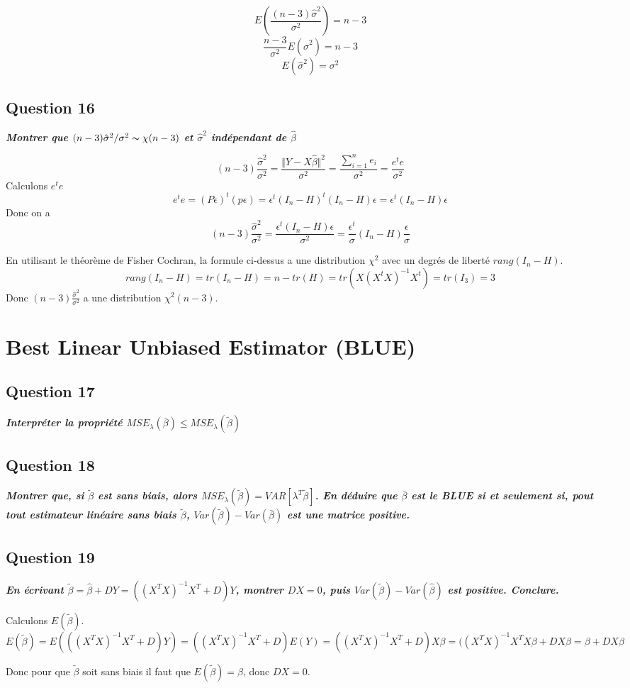 \documentclass[pdflatex]{article}
\theoremstyle{definition}
\newcommand{\quest}[1]{\textbf{\textit{#1}} \vspace{3mm}}
\begin{document}
$$
E\left(\frac{(n-3)\hat{\sigma}^2}{\sigma^2}\right) = n-3
$$
$$
\frac{n-3}{\sigma^2}E(\hat{\sigma}^2) = n-3
$$
$$
E(\hat{\sigma}^2) = \sigma^2
$$




\subsection*{Question 16}
\quest{Montrer que $(n-3)\hat{\sigma}^2/\sigma^2 \thicksim \chi (n-3)$ et $\hat{\sigma}^2$ ind\'ependant de $\hat{\beta}$}

$$
(n-3)\frac{\hat{\sigma}^2}{\sigma^2} = \frac{\Vert Y - X\hat{\beta}\Vert^2}{\sigma^2} = \frac{\sum_{i=1}^{n}e_i}{\sigma^2} = \frac{e^te}{\sigma^2}
$$
Calculons $e^te$
$$
e^te = (P\epsilon)^t(p\epsilon) = \epsilon^t(I_n-H)^t(I_n - H)\epsilon = \epsilon^t(I_n - H)\epsilon
$$
Donc on a 
$$
(n-3)\frac{\hat{\sigma}^2}{\sigma^2} = \frac{\epsilon^t(I_n - H)\epsilon}{\sigma^2} = \frac{\epsilon^t}{\sigma}(I_n - H)\frac{\epsilon}{\sigma}
$$

En utilisant le th\'eor\`eme de Fisher Cochran, la formule ci-dessus a une distribution $\chi^2$ avec un degr\'es de libert\'e $rang(I_n-H)$.
$$
rang(I_n - H) = tr(I_n -H) = n - tr(H) = tr(X(X^tX)^{-1}X^t) = tr(I_3) = 3
$$
Donc 
$(n-3)\frac{\hat{\sigma}^2}{\sigma^2}$ a une distribution $\chi^2(n-3)$.


\section*{Best Linear Unbiased Estimator (BLUE)}

\subsection*{Question 17}
\quest{Interpr\'eter la propri\'et\'e $MSE_{\lambda}(\bar{\beta}) \leq MSE_{\lambda}(\tilde{\beta})$}

\subsection*{Question 18}
\quest{Montrer que, si $\tilde{\beta}$ est sans biais, alors $MSE_\lambda(\tilde{\beta}) = VAR[\lambda^T\tilde{\beta}]$. En d\'eduire que $\bar{\beta}$ est le BLUE si et seulement si, pout tout estimateur lin\'eaire sans biais $\tilde{\beta}$, $Var(\tilde{\beta}) - Var(\bar{\beta})$ est une matrice positive.}

\subsection*{Question 19}
\quest{En \'ecrivant $\tilde{\beta} = \hat{\beta} + DY = ((X^TX)^{-1}X^T+D)Y$, montrer $DX = 0$, puis $Var(\tilde{\beta}) - Var(\hat{\beta})$ est positive. Conclure.}

Calculons $E(\tilde{\beta})$.
$$
E(\tilde{\beta}) = E(((X^TX)^{-1}X^T+D)Y) = ((X^TX)^{-1}X^T+D)E(Y) = ((X^TX)^{-1}X^T+D)X\beta = ((X^TX)^{-1}X^TX\beta+DX\beta = \beta +DX\beta
$$

Donc pour que $\tilde{\beta}$ soit sans biais il faut que $E(\tilde{\beta}) = \beta$, donc $DX=0$.

\end{document}
